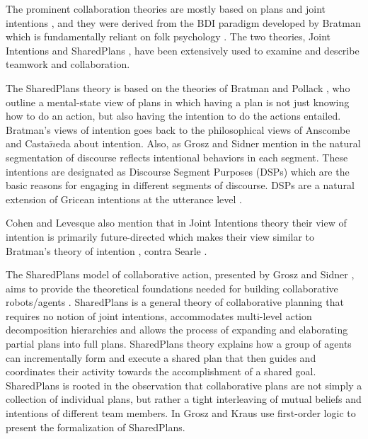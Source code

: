 The prominent collaboration theories are mostly based on plans and joint
intentions
\cite{cohen:teamwork,grosz:plans-discourse,Litman:discourse-commonsense}, and
they were derived from the BDI paradigm developed by Bratman
\cite{bratman:intentions-plans} which is fundamentally reliant on folk
psychology \cite{ravenscroft:folk}. The two theories, Joint Intentions
\cite{cohen:teamwork} and SharedPlans \cite{grosz:plans-discourse}, have been
extensively used to examine and describe teamwork and collaboration.

The SharedPlans theory is based on the theories of Bratman and Pollack
\cite{bratman:plans-reasoning,pollack:plan-inference,pollack:plan-mental-attitudes},
who outline a mental-state view of plans in which having a plan is not just
knowing how to do an action, but also having the intention to do the actions
entailed. Bratman's views of intention goes back to the philosophical views of
Anscombe \cite{anscombe:intention} and Casta$\tilde{n}$eda
\cite{castaneda:thinking} about intention. Also, as Grosz and Sidner mention in
\cite{grosz:plans-discourse} the natural segmentation of discourse reflects
intentional behaviors in each segment. These intentions are designated as
Discourse Segment Purposes (DSPs) which are the basic reasons for engaging in
different segments of discourse. DSPs are a natural extension of Gricean
intentions at the utterance level \cite{neale:grice-language}.

Cohen and Levesque also mention that in Joint Intentions theory their view of
intention is primarily future-directed \cite{cohen:intention-commitment} which
makes their view similar to Bratman's theory of intention
\cite{bratman:intention}, contra Searle \cite{searle:collective}.

The SharedPlans model of collaborative action, presented by Grosz and Sidner
\cite{grosz:planning-acting,grosz:collaboration,grosz:plans-discourse}, aims
to provide the theoretical foundations needed for building collaborative
robots/agents \cite{grosz:collaborative-systems}. SharedPlans is a general
theory of collaborative planning that requires no notion of joint intentions,
accommodates multi-level action decomposition hierarchies and allows the process
of expanding and elaborating partial plans into full plans. SharedPlans theory
explains how a group of agents can incrementally form and execute a shared plan
that then guides and coordinates their activity towards the accomplishment of a
shared goal. SharedPlans is rooted in the observation that collaborative plans
are not simply a collection of individual plans, but rather a tight interleaving
of mutual beliefs and intentions of different team members. In
\cite{grosz:collaboration} Grosz and Kraus use first-order logic to present the
formalization of SharedPlans.

